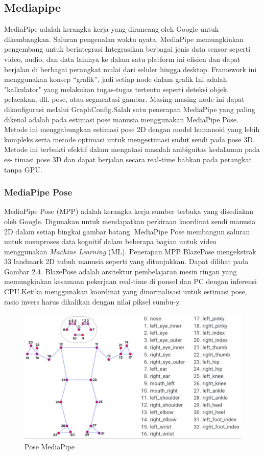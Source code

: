 \subsection{Mediapipe}
MediaPipe adalah kerangka kerja yang dirancang oleh Google untuk dikembangkan.
Saluran pengenalan waktu nyata. MediaPipe memungkinkan pengembang untuk berintegrasi
Integrasikan berbagai jenis data sensor seperti video, audio, dan data lainnya ke dalam satu platform ini efisien dan dapat berjalan di berbagai perangkat mulai dari seluler hingga desktop.
Framework ini menggunakan konsep “grafik”, jadi setiap node dalam grafik Ini adalah "kalkulator" yang melakukan tugas-tugas tertentu seperti deteksi objek, pelacakan, dll. pose, atau segmentasi gambar. Masing-masing node ini dapat dikonfigurasi melalui GraphConfig.Salah satu penerapan MediaPipe yang paling dikenal adalah pada estimasi pose manusia menggunakan MediaPipe Pose. Metode ini menggabungkan estimasi pose 2D dengan model
humanoid yang lebih kompleks serta metode optimasi untuk mengestimasi sudut sendi pada
pose 3D. Metode ini terbukti efektif dalam mengatasi masalah ambiguitas kedalaman pada es-
timasi pose 3D dan dapat berjalan secara real-time bahkan pada perangkat tanpa GPU\cite{Lugaresi2019}.
\subsubsection{MediaPipe Pose}
MediaPipe Pose (MPP) adalah kerangka kerja sumber terbuka yang disediakan oleh Google.
Digunakan untuk mendapatkan perkiraan koordinat sendi manusia 2D dalam setiap bingkai gambar batang. MediaPipe Pose membangun saluran untuk memproses data kognitif dalam beberapa bagian untuk video menggunakan \emph{Machine Learning} (ML). Penerapan MPP
BlazePose mengekstrak 33 landmark 2D tubuh manusia seperti yang ditunjukkan.
Dapat dilihat pada Gambar 2.4. BlazePose adalah arsitektur pembelajaran mesin ringan yang memungkinkan kesamaan pekerjaan real-time di ponsel dan PC dengan inferensi CPU.Ketika menggunakan koordinat yang dinormalisasi untuk estimasi pose, rasio invers harus dikalikan dengan nilai piksel sumbu-y\cite{kim2023human}.
\begin{figure} [H] \centering
  \includegraphics[scale=0.3]{gambar/mediapipepose.jpg}
  \caption{Pose MediaPipe }
  \label{fig:Pose MediaPipe }
\end{figure}

